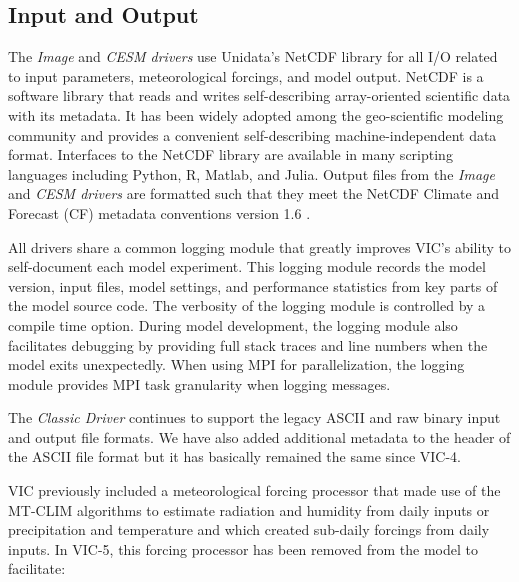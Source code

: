 \documentclass[gmd, manuscript]{copernicus}
\begin{document}
  \subsection{Input and Output}
    \label{sec:io}
    The \textit{Image} and \textit{CESM drivers} use Unidata's NetCDF library for all I/O related to input parameters, meteorological forcings, and model output. NetCDF is a software library that reads and writes self-describing array-oriented scientific data with its metadata. It has been widely adopted among the geo-scientific modeling community and provides a convenient self-describing machine-independent data format. Interfaces to the NetCDF library are available in many scripting languages including Python, R, Matlab, and Julia. Output files from the \textit{Image} and \textit{CESM drivers} are formatted such that they meet the NetCDF Climate and Forecast (CF) metadata conventions version 1.6 \citep{Eaton_2003}.

    All drivers share a common logging module that greatly improves VIC's ability to self-document each model experiment. This logging module records the model version, input files, model settings, and performance statistics from key parts of the model source code. The verbosity of the logging module is controlled by a compile time option. During model development, the logging module also facilitates debugging by providing full stack traces and line numbers when the model exits unexpectedly. When using MPI for parallelization, the logging module provides MPI task granularity when logging messages.

    The \textit{Classic Driver} continues to support the legacy ASCII and raw binary input and output file formats. We have also added additional metadata to the header of the ASCII file format but it has basically remained the same since VIC-4.

    VIC previously included a meteorological forcing processor that made use of the MT-CLIM algorithms to estimate radiation and humidity from daily inputs or precipitation and temperature and which created sub-daily forcings from daily inputs. In VIC-5, this forcing processor has been removed from the model to facilitate:
\end{document}
